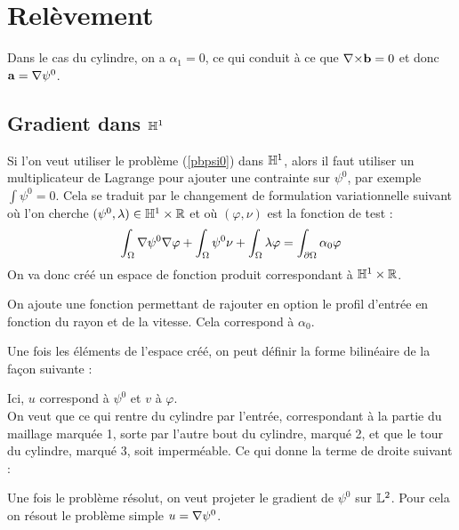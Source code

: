 \section{Relèvement}

Dans le cas du cylindre, on a $\alpha_1=0$, ce qui conduit à ce que ${\nabla\times} \mathbf{b}=0$ et donc $\mathbf{a}={\nabla}\psi^0$.

\subsection{Gradient dans ${\mathbb{H}}^1$}
\label{gradh1}

Si l'on veut utiliser le problème (\ref{pbpsi0}) dans ${\mathbb{H}}^1$, alors il faut utiliser un multiplicateur de Lagrange pour ajouter une contrainte sur $\psi^0$, par exemple $\int \psi^0 = 0$. Cela se traduit par le changement de formulation variationnelle suivant où l'on cherche $(\psi^0,\lambda)\in {\mathbb{H}}^1\times{\mathbb{R}}$ et où $(\varphi,\nu)$ est la fonction de test :
\[
\int_\Omega{\nabla} \psi^0{\nabla}\varphi + \int_\Omega \psi^0\nu + \int_\Omega \lambda\varphi = \int_{\partial\Omega} \alpha_0\varphi
\]
On va donc créé un espace de fonction produit correspondant à ${\mathbb{H}}^1\times{\mathbb{R}}$.



On ajoute une fonction permettant de rajouter en option le profil d'entrée en fonction du rayon et de la vitesse. Cela correspond à $\alpha_0$.



Une fois les éléments de l'espace créé, on peut définir la forme bilinéaire de la façon suivante :



Ici, $u$ correspond à $\psi^0$ et $v$ à $\varphi$.\\

On veut que ce qui rentre du cylindre par l'entrée, correspondant à la partie du maillage marquée 1, sorte par l'autre bout du cylindre, marqué 2, et que le tour du cylindre, marqué 3, soit imperméable. Ce qui donne la terme de droite suivant :



Une fois le problème résolut, on veut projeter le gradient de $\psi^0$ sur ${\mathbb{L}}^2$. Pour cela on résout le problème simple $u={\nabla}\psi^0$.



